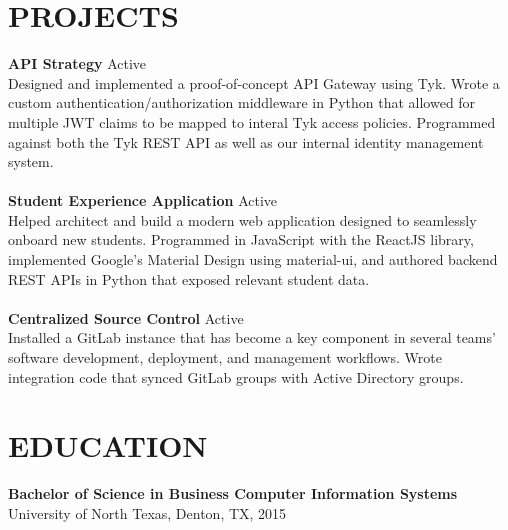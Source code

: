 \documentclass[margin,]{res}
\begin{document}
\begin{resume}
\section{PROJECTS}
\textbf{API Strategy} \hfill Active \\ [5pt]
Designed and implemented a proof-of-concept API Gateway using Tyk. Wrote a custom authentication/authorization middleware in Python that allowed for multiple JWT claims to be mapped to interal Tyk access policies. Programmed against both the Tyk REST API as well as our internal identity management system. \\ \\
\textbf{Student Experience Application} \hfill Active \\ [5pt]
Helped architect and build a modern web application designed to seamlessly onboard new students. Programmed in JavaScript with the ReactJS library, implemented Google's Material Design using material-ui, and authored backend REST APIs in Python that exposed relevant student data. \\ \\
\textbf{Centralized Source Control} \hfill Active \\ [5pt]
Installed a GitLab instance that has become a key component in several teams' software development, deployment, and management workflows. Wrote integration code that synced GitLab groups with Active Directory groups.
\section{EDUCATION} 
\textbf{Bachelor of Science in Business Computer Information Systems} \\
University of North Texas, Denton, TX, 2015 \\
 
\end{resume}
\end{document}
